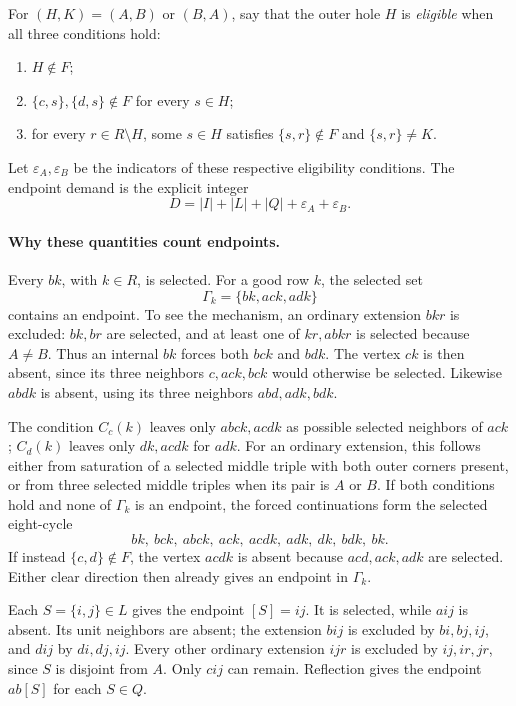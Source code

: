 \documentclass[11pt,a4paper]{article}
\theoremstyle{definition}
\theoremstyle{remark}
\begin{document}
For $(H,K)=(A,B)$ or $(B,A)$, say that the outer hole $H$ is
\emph{eligible} when all three conditions hold:
\begin{enumerate}
\item $H\notin F$;
\item $\{c,s\},\{d,s\}\notin F$ for every $s\in H$;
\item for every $r\in R\setminus H$, some $s\in H$ satisfies
      $\{s,r\}\notin F$ and $\{s,r\}\ne K$.
\end{enumerate}
Let $\varepsilon_A,\varepsilon_B$ be the indicators of these respective
eligibility conditions. The endpoint demand is the explicit integer
\begin{equation}\label{eq:ordinary-endpoint-demand}
 D=|I|+|L|+|Q|+\varepsilon_A+\varepsilon_B.
\end{equation}

\paragraph{Why these quantities count endpoints.}
Every $bk$, with $k\in R$, is selected. For a good row $k$, the selected
set
\[
 \Gamma_k=\{bk,ack,adk\}
\]
contains an endpoint. To see the mechanism, an ordinary extension $bkr$
is excluded: $bk,br$ are selected, and at least one of $kr,abkr$ is selected
because $A\ne B$. Thus an internal $bk$ forces both $bck$ and $bdk$.
The vertex $ck$ is then absent, since its three neighbors $c,ack,bck$
would otherwise be selected. Likewise $abdk$ is absent, using its three
neighbors $abd,adk,bdk$.

The condition $C_c(k)$ leaves only $abck,acdk$ as possible selected
neighbors of $ack$; $C_d(k)$ leaves only $dk,acdk$ for $adk$. For an
ordinary extension, this follows either from saturation of a selected
middle triple with both outer corners present, or from three selected
middle triples when its pair is $A$ or $B$. If both conditions hold and
none of $\Gamma_k$ is an endpoint, the forced continuations form the
selected eight-cycle
\[
 bk,\ bck,\ abck,\ ack,\ acdk,\ adk,\ dk,\ bdk,\ bk.
\]
If instead $\{c,d\}\notin F$, the vertex $acdk$ is absent because
$acd,ack,adk$ are selected. Either clear direction then already gives
an endpoint in $\Gamma_k$.

Each $S=\{i,j\}\in L$ gives the endpoint $[S]=ij$. It is selected, while
$aij$ is absent. Its unit neighbors are absent; the extension $bij$ is
excluded by $bi,bj,ij$, and $dij$ by $di,dj,ij$. Every other ordinary
extension $ijr$ is excluded by $ij,ir,jr$, since $S$ is disjoint from $A$.
Only $cij$ can remain. Reflection gives the endpoint $ab[S]$ for each
$S\in Q$.
\end{document}
